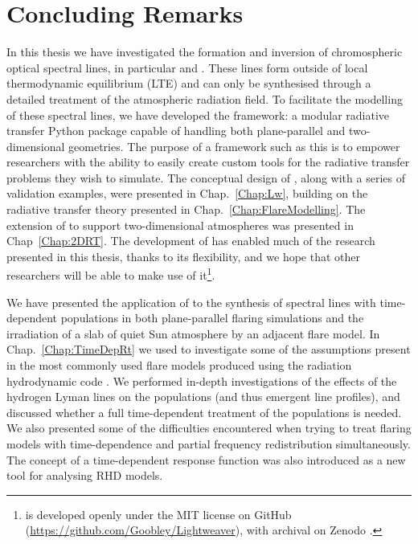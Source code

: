 \chapter{Concluding Remarks}\label{Chap:Conclusions}

In this thesis we have investigated the formation and inversion of chromospheric optical spectral lines, in particular \Ha{} and \CaLine{}.
These lines form outside of local thermodynamic equilibrium (LTE) and can only be synthesised through a detailed treatment of the atmospheric radiation field.
To facilitate the modelling of these spectral lines, we have developed the \Lw{} framework: a modular radiative transfer Python package capable of handling both plane-parallel and two-dimensional geometries.
The purpose of a framework such as this is to empower researchers with the ability to easily create custom tools for the radiative transfer problems they wish to simulate.
The conceptual design of \Lw{}, along with a series of validation examples, were presented in Chap.~\ref{Chap:Lw}, building on the radiative transfer theory presented in Chap.~\ref{Chap:FlareModelling}.
The extension of \Lw{} to support two-dimensional atmospheres was presented in Chap~\ref{Chap:2DRT}.
The development of \Lw{} has enabled much of the research presented in this thesis, thanks to its flexibility, and we hope that other researchers will be able to make use of it\footnote{\Lw{} \citep{Osborne2021} is developed openly under the MIT license on GitHub (\url{https://github.com/Goobley/Lightweaver}), with archival on Zenodo \citep{LightweaverZenodo}.}.

We have presented the application of \Lw{} to the synthesis of spectral lines with time-dependent populations in both plane-parallel flaring simulations and the irradiation of a slab of quiet Sun atmosphere by an adjacent flare model.
In Chap.~\ref{Chap:TimeDepRt} we used \Lw{} to investigate some of the assumptions present in the most commonly used flare models produced using the \Sota{} radiation hydrodynamic code \Radyn{}.
We performed in-depth investigations of the effects of the hydrogen Lyman lines on the \Caii{} populations (and thus emergent line profiles), and discussed whether a full time-dependent treatment of the \Caii{} populations is needed.
We also presented some of the difficulties encountered when trying to treat flaring models with time-dependence and partial frequency redistribution simultaneously.
The concept of a time-dependent response function was also introduced as a new tool for analysing RHD models.

